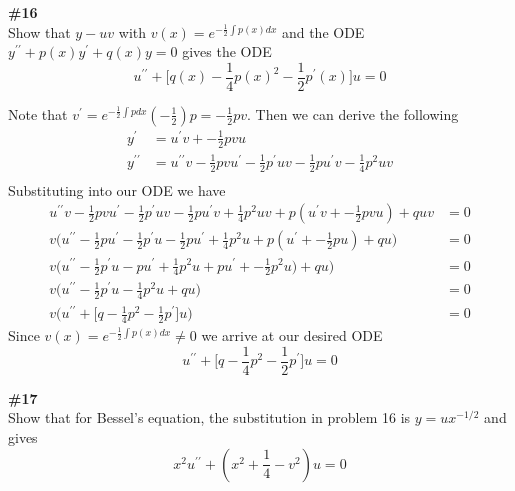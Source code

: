 \documentclass[12pt]{article}
\newcommand{\problem}[1]{\hspace{-4 ex} \large \textbf{#1}\\}
\begin{document}
\problem{\#16} Show that $y-uv$ with $v(x)=e^{-\frac{1}{2}\int p(x)dx}$ and the ODE \\$y^{\prime\prime} + p(x)y^\prime + q(x)y=0$ gives the ODE $$u^{\prime\prime} + \Big[q(x) - \frac{1}{4}p(x)^2 - \frac{1}{2}p^\prime(x) \Big]u = 0$$

	Note that $v^\prime = e^{-\frac{1}{2}\int p dx} (-\frac{1}{2})p = -\frac{1}{2}pv$. Then we can derive the following
	\begin{align*}
		y^\prime & = u^\prime v + -\frac{1}{2}pvu \\
		y^{\prime\prime} & = u^{\prime\prime} v - \frac{1}{2}pvu^\prime -\frac{1}{2}p^\prime uv -\frac{1}{2}p u^\prime v - \frac{1}{4}p^2 u v\\
	\end{align*}
	Substituting into our ODE we have
	\begin{align*}
		u^{\prime\prime} v - \frac{1}{2}pvu^\prime -\frac{1}{2}p^\prime uv -\frac{1}{2}p u^\prime v + \frac{1}{4}p^2 u v + p(u^\prime v + -\frac{1}{2}pvu) + quv & = 0 \\
		v \Big(u^{\prime\prime} - \frac{1}{2}pu^\prime -\frac{1}{2}p^\prime u -\frac{1}{2}p u^\prime + \frac{1}{4}p^2 u + p(u^\prime + -\frac{1}{2}pu) + qu \Big) & = 0 \\
		v \Big(u^{\prime\prime} -\frac{1}{2}p^\prime u - p u^\prime + \frac{1}{4}p^2 u + pu^\prime + -\frac{1}{2}p^2u) + qu \Big) & = 0 \\
		v \Big(u^{\prime\prime} -\frac{1}{2}p^\prime u - \frac{1}{4}p^2 u + qu \Big) & = 0 \\
		v \Big(u^{\prime\prime} + \Big[ q  - \frac{1}{4}p^2 - \frac{1}{2}p^\prime \Big]u \Big) & = 0
	\end{align*}
	Since $v(x)=e^{-\frac{1}{2}\int p(x)dx} \neq 0$ we arrive at our desired ODE
	$$
	u^{\prime\prime} + \Big[ q  - \frac{1}{4}p^2 - \frac{1}{2}p^\prime \Big]u = 0
	$$
	
\problem{\#17} Show that for Bessel's equation, the substitution in problem 16 is $y=ux^{-1/2}$ and gives $$x^2u^{\prime\prime} + (x^2 + \frac{1}{4} - v^2)u=0$$
\end{document}
